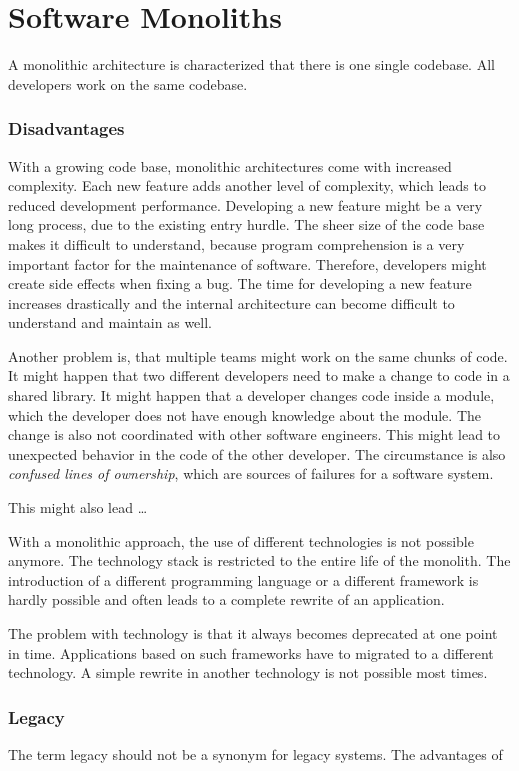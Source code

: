 \section{Software Monoliths}

A monolithic architecture is characterized that there is one single codebase. All developers work on the same codebase.

\subsubsection{Disadvantages}

With a growing code base, monolithic architectures come with increased complexity. Each new feature adds another level of complexity, which leads to reduced development performance. Developing a new feature might be a very long process, due to the existing entry hurdle. The sheer size of the code base makes it difficult to understand, because program comprehension is a very important factor for the maintenance of software. Therefore, developers might create side effects when fixing a bug. The time for developing a new feature increases drastically and the internal architecture can become difficult to understand and maintain as well.

Another problem is, that multiple teams might work on the same chunks of code. It might happen that two different developers need to make a change to code in a shared library. It might happen that a developer changes code inside a module, which the developer does not have enough knowledge about the module. The change is also not coordinated with other software engineers. This might lead to unexpected behavior in the code of the other developer. The circumstance is also \textit{confused lines of ownership}, which are sources of failures for a software system.

This might also lead \dots

With a monolithic approach, the use of different technologies is not possible anymore. The technology stack is restricted to the entire life of the monolith. The introduction of a different programming language or a different framework is hardly possible and often leads to a complete rewrite of an application. \cite{book:2018:richardson:microservices-patterns}

The problem with technology is that it always becomes deprecated at one point in time. Applications based on such frameworks have to migrated to a different technology. A simple rewrite in another technology is not possible most times.

\subsubsection{Legacy}

The term legacy should not be a synonym for legacy systems. The advantages of 
